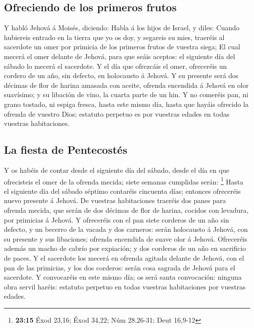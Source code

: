 \hypertarget{ofreciendo-de-los-primeros-frutos}{%
\subsection{Ofreciendo de los primeros
frutos}\label{ofreciendo-de-los-primeros-frutos}}

 Y habló Jehová á Moisés, diciendo:  Habla
á los hijos de Israel, y diles: Cuando hubiereis entrado en la tierra
que yo os doy, y segareis su mies, traeréis al sacerdote un omer por
primicia de los primeros frutos de vuestra siega;  El
cual mecerá el omer delante de Jehová, para que seáis aceptos: el
siguiente día del sábado lo mecerá el sacerdote.  Y el
día que ofrezcáis el omer, ofreceréis un cordero de un año, sin defecto,
en holocausto á Jehová.  Y su presente será dos décimas
de flor de harina amasada con aceite, ofrenda encendida á Jehová en olor
suavísimo; y su libación de vino, la cuarta parte de un hin.
 Y no comeréis pan, ni grano tostado, ni espiga fresca,
hasta este mismo día, hasta que hayáis ofrecido la ofrenda de vuestro
Dios; estatuto perpetuo es por vuestras edades en todas vuestras
habitaciones.

\hypertarget{la-fiesta-de-pentecostuxe9s}{%
\subsection{La fiesta de
Pentecostés}\label{la-fiesta-de-pentecostuxe9s}}

 Y os habéis de contar desde el siguiente día del sábado,
desde el día en que ofrecisteis el omer de la ofrenda mecida; siete
semanas cumplidas serán: \footnote{\textbf{23:15} Éxod 23,16; Éxod
  34,22; Núm 28,26-31; Deut 16,9-12}  Hasta el siguiente
día del sábado séptimo contaréis cincuenta días; entonces ofreceréis
nuevo presente á Jehová.  De vuestras habitaciones
traeréis dos panes para ofrenda mecida, que serán de dos décimas de flor
de harina, cocidos con levadura, por primicias á Jehová. 
Y ofreceréis con el pan siete corderos de un año sin defecto, y un
becerro de la vacada y dos carneros: serán holocausto á Jehová, con su
presente y sus libaciones; ofrenda encendida de suave olor á Jehová.
 Ofreceréis además un macho de cabrío por expiación; y
dos corderos de un año en sacrificio de paces.  Y el
sacerdote los mecerá en ofrenda agitada delante de Jehová, con el pan de
las primicias, y los dos corderos: serán cosa sagrada de Jehová para el
sacerdote.  Y convocaréis en este mismo día; os será
santa convocación: ninguna obra servil haréis: estatuto perpetuo en
todas vuestras habitaciones por vuestras edades.

